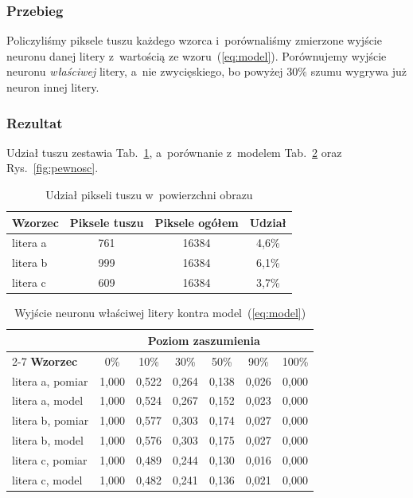 \documentclass[12pt]{article}
\begin{document}
\subsubsection{Przebieg}
Policzyliśmy piksele tuszu każdego wzorca i~porównaliśmy zmierzone wyjście
neuronu danej litery z~wartością ze wzoru~(\ref{eq:model}). Porównujemy wyjście
neuronu \emph{właściwej} litery, a~nie zwycięskiego, bo powyżej $30\%$ szumu
wygrywa już neuron innej litery.

\subsubsection{Rezultat}
Udział tuszu zestawia Tab.~\ref{tab:tusz}, a~porównanie z~modelem
Tab.~\ref{tab:model} oraz Rys.~\ref{fig:pewnosc}.

\begin{table}[h]
\centering
\caption{Udział pikseli tuszu w~powierzchni obrazu}
\label{tab:tusz}
\begin{tabular}{lccc}
\toprule
\textbf{Wzorzec} & \textbf{Piksele tuszu} & \textbf{Piksele ogółem} & \textbf{Udział} \\
\midrule
litera a & 761 & 16384 & 4,6\% \\
litera b & 999 & 16384 & 6,1\% \\
litera c & 609 & 16384 & 3,7\% \\
\bottomrule
\end{tabular}
\end{table}

\begin{table}[h]
\centering
\caption{Wyjście neuronu właściwej litery kontra model~(\ref{eq:model})}
\label{tab:model}
\small
\begin{tabular}{lcccccc}
\toprule
 & \multicolumn{6}{c}{\textbf{Poziom zaszumienia}} \\
\cmidrule(l){2-7}
\textbf{Wzorzec} & 0\% & 10\% & 30\% & 50\% & 90\% & 100\% \\
\midrule
litera a, pomiar & 1,000 & 0,522 & 0,264 & 0,138 & 0,026 & 0,000 \\
litera a, model  & 1,000 & 0,524 & 0,267 & 0,152 & 0,023 & 0,000 \\[1mm]
litera b, pomiar & 1,000 & 0,577 & 0,303 & 0,174 & 0,027 & 0,000 \\
litera b, model  & 1,000 & 0,576 & 0,303 & 0,175 & 0,027 & 0,000 \\[1mm]
litera c, pomiar & 1,000 & 0,489 & 0,244 & 0,130 & 0,016 & 0,000 \\
litera c, model  & 1,000 & 0,482 & 0,241 & 0,136 & 0,021 & 0,000 \\
\bottomrule
\end{tabular}
\end{table}
\end{document}
